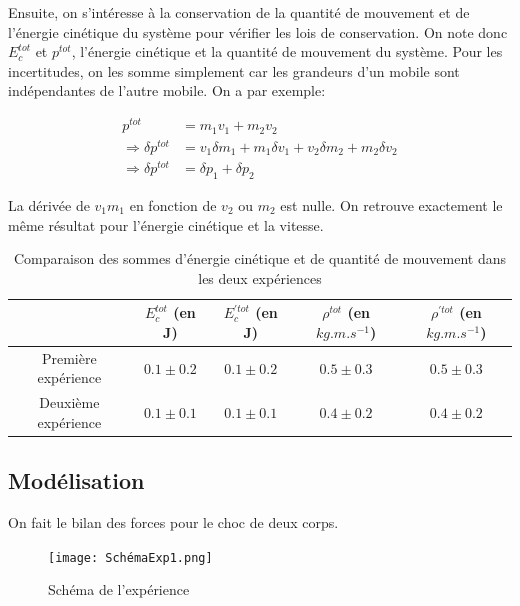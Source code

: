 \documentclass[12pt]{article}
\begin{document}
\newpage

Ensuite, on s'intéresse à la conservation de la quantité de mouvement et de l'énergie cinétique du système pour
vérifier les lois de conservation. On note donc $E_c^{tot}$ et $p^{tot}$, l'énergie cinétique et la quantité de mouvement du système. 
Pour les incertitudes, on les somme simplement car les grandeurs d'un mobile sont indépendantes de l'autre mobile. On a par exemple:

\begin{align}
    p^{tot} & = m_1v_1 + m_2v_2 \\
    \Rightarrow \delta p^{tot} & = v_1\delta m_1 + m_1\delta v_1 + v_2\delta m_2 + m_2\delta v_2 \\
    \Rightarrow \delta p^{tot} & = \delta p_1 + \delta p_2
\end{align}

La dérivée de $v_1m_1$ en fonction de $v_2$ ou $m_2$ est nulle. On retrouve exactement le même résultat pour l'énergie cinétique et la vitesse.

\begin{table}[!h]
	\begin{center}
		\begin{tabular}{|c|c|c|c|c|}
		\hline
		& $E_c^{tot}$ (en J) & $E_c^{'tot}$ (en J)& $\rho^{tot}$ (en $kg.m.s^{-1}$) & $\rho^{'tot}$ (en $kg.m.s^{-1}$)\\
		\hline
		Première expérience & $0.1 \pm 0.2$ & $0.1\pm 0.2$ & $0.5\pm 0.3$ & $0.5\pm 0.3$\\
		\hline
		Deuxième expérience & $0.1\pm 0.1$ & $0.1\pm 0.1$ & $0.4\pm 0.2$ & $0.4\pm 0.2$\\
		\hline		
		\end{tabular}
		\label{TableauSomme}
		\caption{Comparaison des sommes d'énergie cinétique et de quantité de mouvement dans les deux expériences}
	\end{center}
\end{table}

\newpage

\subsection{Modélisation}

On fait le bilan des forces pour le choc de deux corps. 
\begin{figure}[!h]
	\begin{center}
		\texttt{[image: SchémaExp1.png]}
		\label{SchmExp1}
		\caption{Schéma de l'expérience}
	\end{center}
\end{figure}
\end{document}

